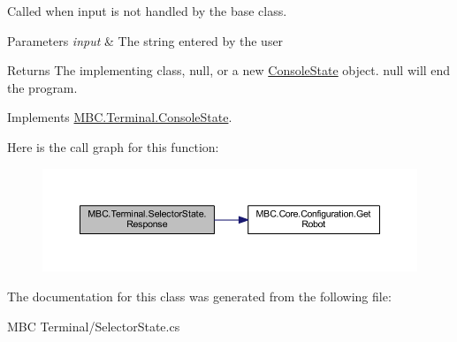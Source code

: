 Called when input is not handled by the base class.


\begin{DoxyParams}{Parameters}
{\em input} & The string entered by the user\\
\hline
\end{DoxyParams}
\begin{DoxyReturn}{Returns}
The implementing class, null, or a new \hyperlink{class_m_b_c_1_1_terminal_1_1_console_state}{Console\-State} object. null will end the program.
\end{DoxyReturn}


Implements \hyperlink{class_m_b_c_1_1_terminal_1_1_console_state_a93d6eee582913a59d10348cdc8ef4248}{M\-B\-C.\-Terminal.\-Console\-State}.



Here is the call graph for this function\-:\nopagebreak
\begin{figure}[H]
\begin{center}
\leavevmode
\includegraphics[width=350pt]{class_m_b_c_1_1_terminal_1_1_selector_state_ad5790cf53b3c3da6269fe2faf9a0e871_cgraph}
\end{center}
\end{figure}




The documentation for this class was generated from the following file\-:\begin{DoxyCompactItemize}
\item 
M\-B\-C Terminal/Selector\-State.\-cs\end{DoxyCompactItemize}
